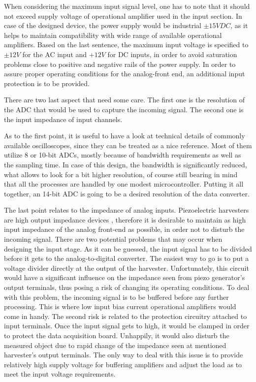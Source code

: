 \documentclass[12pt,a4paper]{article}
\begin{document}
When considering the maximum input signal level, one has to note that it should not exceed supply voltage of operational amplifier used in the input section. In case of the designed device, the power supply would be industrial $\pm{15}VDC$, as it helps to maintain compatibility with wide range of available operational amplifiers. Based on the last sentence, the maximum input voltage is specified to $\pm{12}V$ for the AC input and $+{12}V$ for DC inputs, in order to avoid saturation problems close to positive and negative rails of the power supply. In order to assure proper operating conditions for the analog-front end, an additional input protection is to be provided.
\par
There are two last aspect that need some care. The first one is the resolution of the ADC that would be used to capture the incoming signal. The second one is the input impedance of input channels.
\par
As to the first point, it is useful to have a look at technical details of commonly available oscilloscopes, since they can be treated as a nice reference. Most of them utilize 8 or 10-bit ADCs, mostly because of bandwidth requirements as well as the sampling time. In case of this design, the bandwidth is significantly reduced, what allows to look for a bit higher resolution, of course still bearing in mind that all the processes are handled by one modest microcontroller. Putting it all together, an 14-bit ADC is going to be a desired resolution of the data converter.
\par
The last point relates to the impedance of analog inputs. Piezoelectric harvesters are high output impedance devices \cite{EnHv1}, therefore it is desirable to maintain as high input impedance of the analog front-end as possible, in order not to disturb the incoming signal. There are two potential problems that may occur when designing the input stage. As it can be guessed, the input signal has to be divided before it gets to the analog-to-digital converter. The easiest way to go is to put a voltage divider directly at the output of the harvester. Unfortunately, this circuit would have a significant influence on the impedance seen from piezo generator's output terminals, thus posing a risk of changing its operating conditions. To deal with this problem, the incoming signal is to be buffered before any further processing. This is where low input bias current operational amplifiers would come in handy. The second risk is related to the protection circuitry attached to input terminals. Once the input signal gets to high, it would be clamped in order to protect the data acquisition board. Unhappily, it would also disturb the measured object due to rapid change of the impedance seen at mentioned harvester's output terminals. The only way to deal with this issue is to provide relatively high supply voltage for buffering amplifiers and adjust the load as to meet the input voltage requirements.
\par
\end{document}
